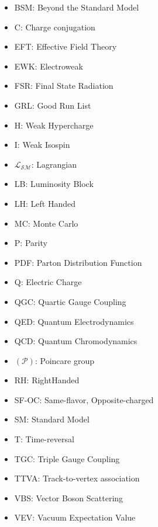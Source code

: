 \begin{itemize}
\item{BSM: Beyond the Standard Model}
\item {C: Charge conjugation}
\item{EFT: Effective Field Theory}
\item{EWK: Electroweak}
\item{FSR: Final State Radiation}
\item{GRL: Good Run List}
\item{H: Weak Hypercharge}
\item{ I: Weak Isospin}
\item{$\mathcal{L_{SM}}$: Lagrangian}
\item{LB: Luminosity Block}
\item{LH:  Left Handed}
\item{MC: Monte Carlo}
\item{P: Parity}
\item{PDF: Parton Distribution Function}
\item{Q: Electric Charge}
\item{QGC: Quartic Gauge Coupling}
\item{QED: Quantum Electrodynamics}
\item{QCD: Quantum Chromodynamics}
\item{$(\mathcal{P})$: Poincare group}
\item{RH: RightHanded}
\item{SF-OC: Same-flavor, Opposite-charged} 
\item{SM: Standard Model}
\item{T: Time-reversal}
\item{TGC: Triple Gauge Coupling}
\item{TTVA: Track-to-vertex association}
\item{VBS: Vector Boson Scattering}
\item{VEV: Vacuum Expectation Value}
\end{itemize}